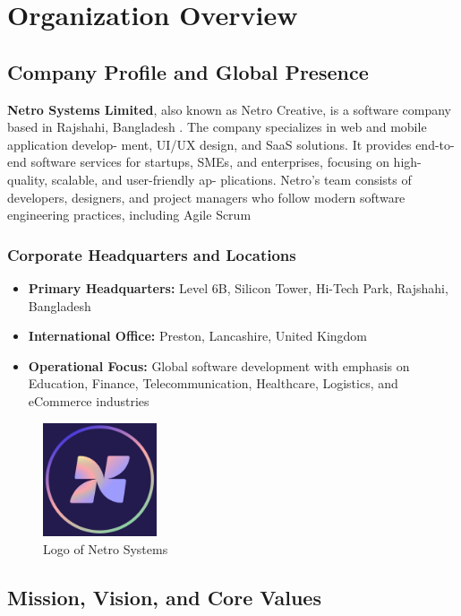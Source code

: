 \documentclass[12pt,a4paper]{report}
\newcommand{\company}[1]{\textcolor{companycolor}{\textbf{#1}}}
\newcommand{\impact}[1]{\textcolor{impactcolor}{\textbf{#1}}}
\let\oldcite\cite
\renewcommand{\cite}[1]{\textcolor{impactcolor}{\oldcite{#1}}}
\newenvironment{coloritemize}
{\begin{itemize}[label=\textcolor{primaryblue}{$\bullet$}]}
{\end{itemize}}
\begin{document}
\chapter{Organization Overview}
\section{Company Profile and Global Presence}
\company{Netro Systems Limited}, also known as Netro Creative, is a software company based in
Rajshahi, Bangladesh \cite{ref1}. The company specializes in web and mobile application develop-
ment, UI/UX design, and SaaS solutions. It provides end-to-end software services for
startups, SMEs, and enterprises, focusing on high-quality, scalable, and user-friendly ap-
plications. Netro’s team consists of developers, designers, and project managers who
follow modern software engineering \cite{ref11} practices, including Agile \cite{ref8} Scrum

\subsection{Corporate Headquarters and Locations}
\begin{coloritemize}
    \item \impact{Primary Headquarters:} Level 6B, Silicon Tower, Hi-Tech Park, Rajshahi, Bangladesh
    \item \impact{International Office:} Preston, Lancashire, United Kingdom
    \item \impact{Operational Focus:} Global software development with emphasis on Education, Finance, Telecommunication, Healthcare, Logistics, and eCommerce industries
\end{coloritemize}

\begin{figure}[h!]
\centering
    \includegraphics[width=0.3\textwidth]{Figures/logo.png}
    \caption{Logo of Netro Systems}
\end{figure}


\section{Mission, Vision, and Core Values}
\end{document}
